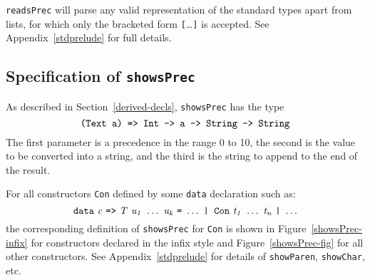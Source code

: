 \mbox{\tt readsPrec} will parse any valid representation of the standard types 
apart from lists, for
which only the bracketed form \mbox{\tt [}\ldots\mbox{\tt ]} is accepted. See
Appendix~\ref{stdprelude} for full details.

%

\subsection{Specification of \mbox{\tt showsPrec}}
\label{showsPrec-spec}

As described in Section~\ref{derived-decls}, \mbox{\tt showsPrec} has the type
\[
\mbox{$\it \makebox{\tt (Text\ a)\ =>\ Int\ ->\ a\ ->\ String\ ->\ String}$}
\]
The first parameter is a
precedence in the range 0 to 10, the second is the value to be
converted into a string, and the third is the string
to append to the end of the result.

For all constructors \mbox{\tt Con} defined by some \mbox{\tt data} declaration
such as:
\[
\mbox{$\it \makebox{\tt data}\ c\ \makebox{\tt =>}\ T\ u_1\ \ldots \ u_k\ \makebox{\tt =}\ \ldots \ \makebox{\tt |\ Con}\ t_1\ \ldots \ t_n\ \makebox{\tt |}\ \ldots $}
\]
the corresponding definition of \mbox{\tt showsPrec} for \mbox{\tt Con} is shown in 
Figure~\ref{showsPrec-infix} for constructors declared in the infix
style and
Figure~\ref{showsPrec-fig} for all other constructors.  
See Appendix~\ref{stdprelude} for details of \mbox{\tt showParen}, \mbox{\tt showChar}, etc.

